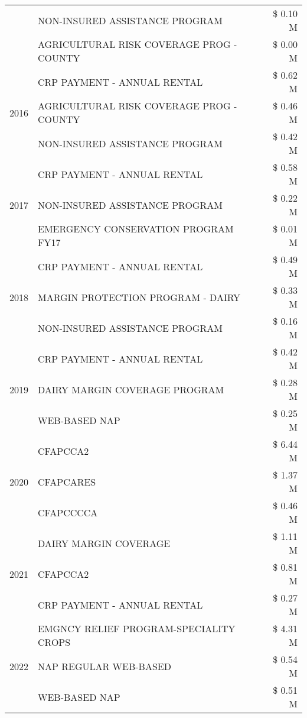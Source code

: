 \begin{tabular}{llr}
 & NON-INSURED ASSISTANCE PROGRAM & \$ 0.10 M \\
 & AGRICULTURAL RISK COVERAGE PROG - COUNTY & \$ 0.00 M \\
\cline{1-3}
\multirow[t]{3}{*}{2016} & CRP PAYMENT - ANNUAL RENTAL & \$ 0.62 M \\
 & AGRICULTURAL RISK COVERAGE PROG - COUNTY & \$ 0.46 M \\
 & NON-INSURED ASSISTANCE PROGRAM & \$ 0.42 M \\
\cline{1-3}
\multirow[t]{3}{*}{2017} & CRP PAYMENT - ANNUAL RENTAL & \$ 0.58 M \\
 & NON-INSURED ASSISTANCE PROGRAM & \$ 0.22 M \\
 & EMERGENCY CONSERVATION PROGRAM FY17 & \$ 0.01 M \\
\cline{1-3}
\multirow[t]{3}{*}{2018} & CRP PAYMENT - ANNUAL RENTAL & \$ 0.49 M \\
 & MARGIN PROTECTION PROGRAM - DAIRY & \$ 0.33 M \\
 & NON-INSURED ASSISTANCE PROGRAM & \$ 0.16 M \\
\cline{1-3}
\multirow[t]{3}{*}{2019} & CRP PAYMENT - ANNUAL RENTAL & \$ 0.42 M \\
 & DAIRY MARGIN COVERAGE PROGRAM & \$ 0.28 M \\
 & WEB-BASED NAP & \$ 0.25 M \\
\cline{1-3}
\multirow[t]{3}{*}{2020} & CFAPCCA2 & \$ 6.44 M \\
 & CFAPCARES & \$ 1.37 M \\
 & CFAPCCCCA & \$ 0.46 M \\
\cline{1-3}
\multirow[t]{3}{*}{2021} & DAIRY MARGIN COVERAGE & \$ 1.11 M \\
 & CFAPCCA2 & \$ 0.81 M \\
 & CRP PAYMENT - ANNUAL RENTAL & \$ 0.27 M \\
\cline{1-3}
\multirow[t]{3}{*}{2022} & EMGNCY RELIEF PROGRAM-SPECIALITY CROPS & \$ 4.31 M \\
 & NAP REGULAR WEB-BASED & \$ 0.54 M \\
 & WEB-BASED NAP & \$ 0.51 M \\
\cline{1-3}
\bottomrule
\end{tabular}
